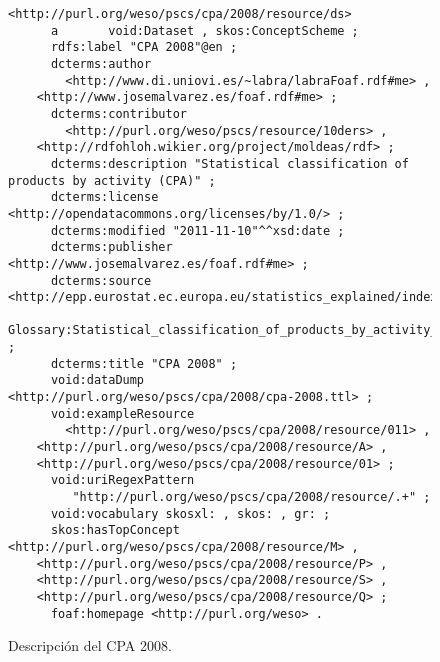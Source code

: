 \begin{figure}[!htp]
\begin{lstlisting}
<http://purl.org/weso/pscs/cpa/2008/resource/ds>
      a       void:Dataset , skos:ConceptScheme ;
      rdfs:label "CPA 2008"@en ;
      dcterms:author 
        <http://www.di.uniovi.es/~labra/labraFoaf.rdf#me> , 
	<http://www.josemalvarez.es/foaf.rdf#me> ;
      dcterms:contributor
        <http://purl.org/weso/pscs/resource/10ders> ,
	<http://rdfohloh.wikier.org/project/moldeas/rdf> ; 
      dcterms:description "Statistical classification of products by activity (CPA)" ;
      dcterms:license <http://opendatacommons.org/licenses/by/1.0/> ;
      dcterms:modified "2011-11-10"^^xsd:date ;
      dcterms:publisher <http://www.josemalvarez.es/foaf.rdf#me> ;
      dcterms:source <http://epp.eurostat.ec.europa.eu/statistics_explained/index.php/
	Glossary:Statistical_classification_of_products_by_activity_%28CPA%29> ;
      dcterms:title "CPA 2008" ;
      void:dataDump <http://purl.org/weso/pscs/cpa/2008/cpa-2008.ttl> ;
      void:exampleResource
        <http://purl.org/weso/pscs/cpa/2008/resource/011> , 
	<http://purl.org/weso/pscs/cpa/2008/resource/A> , 
	<http://purl.org/weso/pscs/cpa/2008/resource/01> ;
      void:uriRegexPattern
         "http://purl.org/weso/pscs/cpa/2008/resource/.+" ;
      void:vocabulary skosxl: , skos: , gr: ;
      skos:hasTopConcept <http://purl.org/weso/pscs/cpa/2008/resource/M> , 
	<http://purl.org/weso/pscs/cpa/2008/resource/P> , 
	<http://purl.org/weso/pscs/cpa/2008/resource/S> , 
	<http://purl.org/weso/pscs/cpa/2008/resource/Q> ;
      foaf:homepage <http://purl.org/weso> .
\end{lstlisting}
	\caption{Descripción del \dataset CPA 2008.}
	\label{fig:pscs-ds-cpa-2008}
\end{figure}


